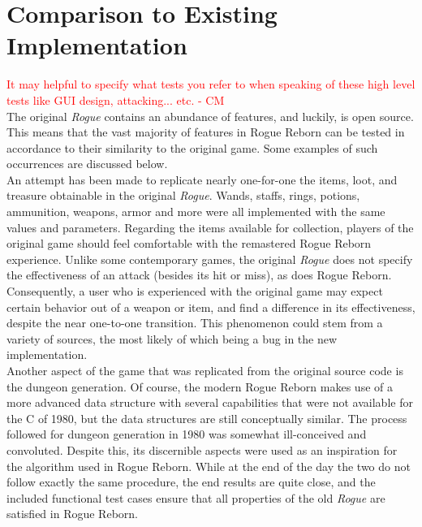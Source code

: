 \documentclass[12pt, titlepage]{article}
\begin{document}
\newpage
\section{Comparison to Existing Implementation}	
\label{section5}
	
	\textcolor{red}{It may helpful to specify what tests you refer to when speaking of these high level tests like GUI design, attacking... etc. - CM} \\
	The original \textit{Rogue} contains an abundance of features, and luckily, is open source.  This means that the vast majority of features in Rogue Reborn can be tested in accordance to their similarity to the original game. Some examples of such occurrences are discussed below.\\

	An attempt has been made to replicate nearly one-for-one the items, loot, and treasure obtainable in the original \textit{Rogue}.  Wands, staffs, rings, potions, ammunition, weapons, armor and more were all implemented with the same values and parameters.  Regarding the items available for collection, players of the original game should feel comfortable with the remastered Rogue Reborn experience.  Unlike some contemporary games, the original \textit{Rogue} does not specify the effectiveness of an attack (besides its hit or miss), as does Rogue Reborn.  Consequently, a user who is experienced with the original game may expect certain behavior out of a weapon or item, and find a difference in its effectiveness, despite the near one-to-one transition.  This phenomenon could stem from a variety of sources, the most likely of which being a bug in the new implementation.\\

	Another aspect of the game that was replicated from the original source code is the dungeon generation.  Of course, the modern Rogue Reborn makes use of a more advanced data structure with several capabilities that were not available for the C of 1980, but the data structures are still conceptually similar.  The process followed for dungeon generation in 1980 was somewhat ill-conceived and convoluted.  Despite this, its discernible aspects were used as an inspiration for the algorithm used in Rogue Reborn.  While at the end of the day the two do not follow exactly the same procedure, the end results are quite close, and the included functional test cases ensure that all properties of the old \textit{Rogue} are satisfied in Rogue Reborn.\\
\end{document}
